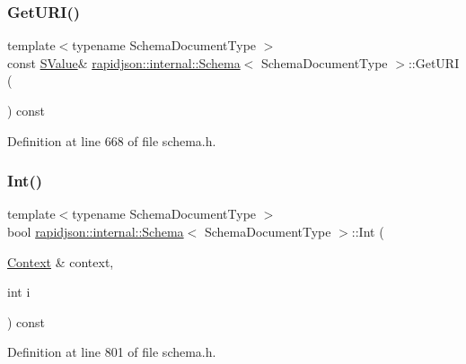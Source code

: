 \subsubsection{\texorpdfstring{GetURI()}{GetURI()}}
{\footnotesize\ttfamily template$<$typename Schema\+Document\+Type $>$ \\
const \mbox{\hyperlink{classrapidjson_1_1internal_1_1_schema_a9f716b06fc542c4cdb7d8d5cf463bf79}{S\+Value}}\& \mbox{\hyperlink{classrapidjson_1_1internal_1_1_schema}{rapidjson\+::internal\+::\+Schema}}$<$ Schema\+Document\+Type $>$\+::Get\+U\+RI (\begin{DoxyParamCaption}{ }\end{DoxyParamCaption}) const}



Definition at line 668 of file schema.\+h.


\begin{DoxyCode}{0}

\end{DoxyCode}
\mbox{\label{classrapidjson_1_1internal_1_1_schema_af2da329dec8daa430f8ff4b146cacbd9}} 
\subsubsection{\texorpdfstring{Int()}{Int()}}
{\footnotesize\ttfamily template$<$typename Schema\+Document\+Type $>$ \\
bool \mbox{\hyperlink{classrapidjson_1_1internal_1_1_schema}{rapidjson\+::internal\+::\+Schema}}$<$ Schema\+Document\+Type $>$\+::Int (\begin{DoxyParamCaption}\item[{\mbox{\hyperlink{classrapidjson_1_1internal_1_1_schema_afca06b1f51d1bc18403bdf3f4d55ffef}{Context}} \&}]{context,  }\item[{int}]{i }\end{DoxyParamCaption}) const}



Definition at line 801 of file schema.\+h.


